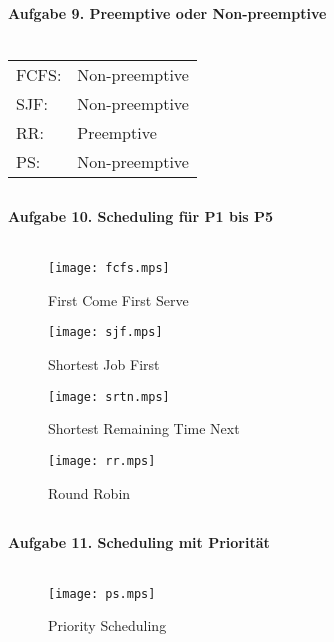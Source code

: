\documentclass{article}
\begin{document}
\subsection*{}
\textbf {Aufgabe 9. Preemptive oder Non-preemptive} \\ \\
\begin{tabularx}{\textwidth}{l l}
  FCFS: & Non-preemptive \\
  SJF: & Non-preemptive \\
  RR: & Preemptive \\
  PS: & Non-preemptive \\
\end{tabularx}

\subsection*{}
\textbf {Aufgabe 10. Scheduling für P1 bis P5} \\ \\
\begin{figure}[h]
  \texttt{[image: fcfs.mps]}
  \caption{First Come First Serve}
  \label{}
\end{figure}

\begin{figure}[h]
  \texttt{[image: sjf.mps]}
  \caption{Shortest Job First}
  \label{}
\end{figure}

\begin{figure}[h]
  \texttt{[image: srtn.mps]}
  \caption{Shortest Remaining Time Next}
  \label{}
\end{figure}

\begin{figure}[h!]
  \texttt{[image: rr.mps]}
  \caption{Round Robin}
  \label{}
\end{figure}

\pagebreak
\subsection*{}
\textbf{Aufgabe 11. Scheduling mit Priorität} \\ \\

\begin{figure}[h]
  \texttt{[image: ps.mps]}
  \caption{Priority Scheduling}
  \label{}
\end{figure}
\end{document}
